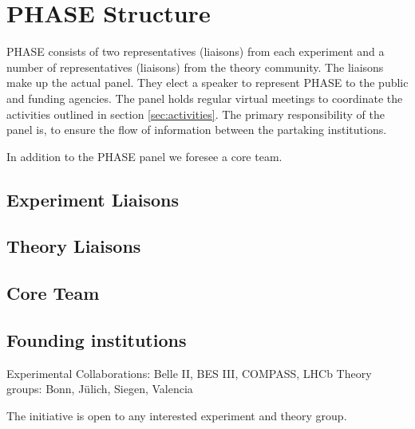 \section{PHASE Structure}
\label{sec:structure}
PHASE consists of two representatives (liaisons) from each experiment and a number of representatives (liaisons) from the theory community. The liaisons make up the actual panel. They elect a speaker to represent PHASE to the public and funding agencies. The panel holds regular virtual meetings to coordinate the activities outlined in section \ref{sec:activities}. The primary responsibility of the panel is, to ensure the flow of information between the partaking institutions.

In addition to the PHASE panel we foresee a core team. 

\subsection{Experiment Liaisons}

\subsection{Theory Liaisons}

\subsection{Core Team}

\subsection{Founding institutions}
Experimental Collaborations: Belle II, BES III, COMPASS, LHCb 
Theory groups: Bonn, J\"ulich, Siegen, Valencia

The initiative is open to any interested experiment and theory group.
